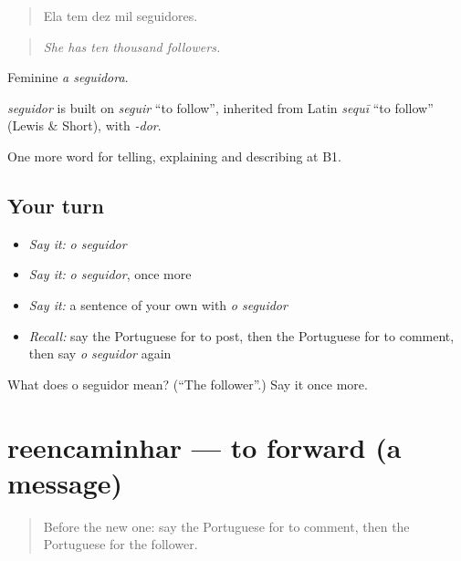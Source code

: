 \begin{quote}
Ela tem dez mil seguidores.
\end{quote}

\begin{quote}
\emph{She has ten thousand followers.}
\end{quote}

Feminine \emph{a seguidora}.

\begin{cousinweb}
\emph{seguidor} is built on \emph{seguir} \textquotedblleft{}to follow\textquotedblright{}, inherited from Latin \emph{sequī} \textquotedblleft{}to follow\textquotedblright{} (Lewis \& Short), with \emph{-dor}.
\end{cousinweb}

\begin{grammarlens}[title={What you've built}]
One more word for telling, explaining and describing at B1.
\end{grammarlens}

\subsection*{Your turn}
\begin{itemize}
\raggedright
  \item \emph{Say it:} \emph{o seguidor}
  \item \emph{Say it:} \emph{o seguidor}, once more
  \item \emph{Say it:} a sentence of your own with \emph{o seguidor}
  \item \emph{Recall:} say the Portuguese for to post, then the Portuguese for to comment, then say \emph{o seguidor} again
\end{itemize}

\begin{tcolorbox}[breakable,colback=teal!4,colframe=teal!35!black,title={Before you move on}]
What does o seguidor mean? (\textquotedblleft{}The follower\textquotedblright{}.) Say it once more.
\end{tcolorbox}
\section[reencaminhar]{reencaminhar — to forward (a message)}

\label{lesson:PT-C400-reencaminhar}



\begin{quote}
Before the new one: say the Portuguese for to comment, then the Portuguese for the follower.
\end{quote}

